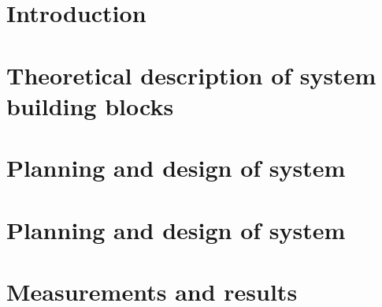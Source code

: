 \documentclass[a4paper,12pt]{report}
\begin{document}












\chapter{ Introduction}


\chapter{ Theoretical description of system building blocks}


\chapter{ Planning and design of system}


\chapter{ Planning and design of system}


\chapter{ Measurements and results}

\end{document}
